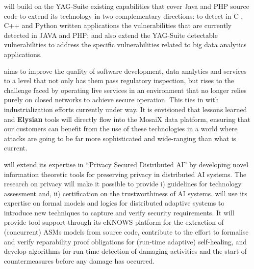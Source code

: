 \documentclass[a4paper,11pt]{article}
\newcommand{\project}[1]{\textbf{#1}\xspace}
\newcommand{\SECURITY}{\project{Elysian}}
\newcommand{\TheProject}{\SECURITY}
\begin{document}
\begin{mdframed}[backgroundcolor=blue!5]
\YAGshort{} will build on the YAG-Suite existing capabilities that cover Java and PHP source code to extend its technology in two complementary directions: %
to detect in C , C++ and Python written applications the vulnerabilities that are currently detected in JAVA and PHP; and also extend the YAG-Suite detectable vulnerabilities to address the specific vulnerabilities related to 
big data analytics applications.

\end{mdframed}

\begin{mdframed}[backgroundcolor=blue!5]
\FRQshort{} aims to %
improve the quality of software development, data analytics and services to a level that not only has them pass regulatory inspection, but rises to the challenge faced by operating live services in an environment that no longer relies purely on closed networks to achieve secure operation. This ties in with industrialization efforts currently under way. It is envisioned that lessons learned and \TheProject{} tools will directly flow into the MosaiX data platform, ensuring that our customers can benefit from the use of these technologies in a world where attacks are going to be far more sophisticated and wide-ranging than what is current. 
\end{mdframed}

\begin{mdframed}[backgroundcolor=blue!5]
\SCCHshort{}
will extend its expertise in ``Privacy Secured Distributed AI'' by developing novel information theoretic tools for preserving privacy in distributed AI systems. The research on privacy 
will make it possible to provide i) guidelines for technology assessment and, ii) certification on the trustworthiness of AI systems. \SCCHshort{} will use its expertise on formal models and logics for distributed adaptive systems to introduce new techniques to capture and verify  security requirements. It will provide tool support through its eKNOWS platform for the extraction of (concurrent) ASMs models from source code, contribute to the effort to formalise and verify reparability proof obligations for (run-time adaptive) self-healing, and develop algorithms for run-time detection of damaging activities and the start of countermeasures before any damage has occurred. 
\end{mdframed}
\end{document}
